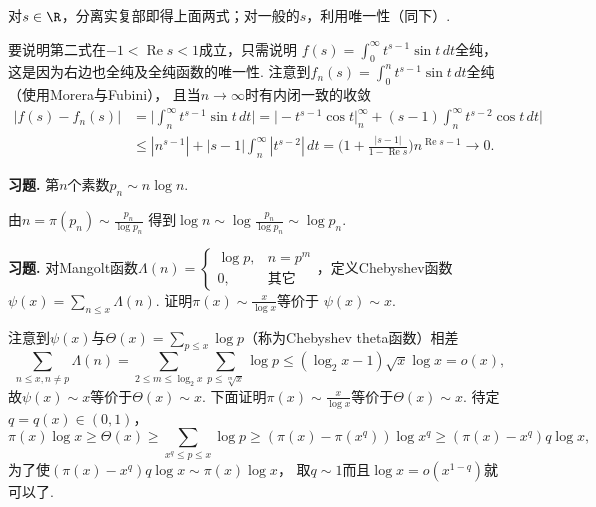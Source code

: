 \begin{proofc}
    对$s\in\R$，分离实复部即得上面两式；对一般的$s$，利用唯一性（同下）.
    要说明第二式在$-1<\operatorname{Re}s<1$成立，只需说明
    $f(s)=\displaystyle{\int_0^\infty t^{s-1}\sin t\,dt}$全纯，
    这是因为右边也全纯及全纯函数的唯一性. 
    注意到$f_n(s)=\displaystyle{\int_0^n t^{s-1}\sin t\,dt}$全纯（使用Morera与Fubini），
    且当$n\rightarrow\infty$时有内闭一致的收敛
    \begin{align*}
        |f(s)-f_n(s)|&=\bigg|\int_n^\infty t^{s-1}\sin t\,dt\bigg|
        =\bigg|-t^{s-1}\cos t\big|_n^\infty
        +(s-1)\int_n^\infty t^{s-2}\cos t\,dt\bigg|\\
        &\leq|n^{s-1}|+|s-1|\int_n^\infty|t^{s-2}|\,dt
        =\Big(1+\frac{|s-1|}{1-\operatorname{Re}s}\Big)
        n^{\operatorname{Re}s-1}\rightarrow0.
    \end{align*}
\end{proofc}

\textbf{习题. } 第$n$个素数$p_n\sim n\log n$.

\begin{proofc}
    由$n=\pi(p_n)\sim\frac{p_n}{\log p_n}$
    得到$\log n\sim \log\frac{p_n}{\log p_n}\sim\log p_n$.
\end{proofc}

\textbf{习题. } 对Mangolt函数$\Lambda(n)
=\begin{cases}\log p,&n=p^m\\0,&\text{其它}\end{cases}$，定义Chebyshev函数
$\psi(x)=\sum\limits_{n\leq x}\Lambda(n)$. 证明$\displaystyle{\pi(x)\sim\frac{x}{\log x}}$等价于
$\psi(x)\sim x$.

\begin{proofc}
    注意到$\psi(x)$与$\varTheta(x)=\sum\limits_{p\leq x}\log p$（称为Chebyshev theta函数）相差
    $$\sum_{n\leq x,n\neq p}\Lambda(n)
    =\sum_{2\leq m\leq\log_2\!x}\sum_{p\leq\!\sqrt[m]{x}}\log p
    \leq(\log_2x-1)\sqrt{x}\log x=o(x),$$
    故$\psi(x)\sim x$等价于$\varTheta(x)\sim x$. 
    下面证明$\pi(x)\sim\frac{x}{\log x}$等价于$\varTheta(x)\sim x$. 
    待定$q=q(x)\in(0,1)$，
    $$\pi(x)\log x\geq\varTheta(x)\geq\sum_{x^q\leq p\leq x}\log p\geq (\pi(x)-\pi(x^q))\log x^q
    \geq(\pi(x)-x^q)q\log x,$$
    为了使$(\pi(x)-x^q)q\log x\sim\pi(x)\log x$，
    取$q\sim 1$而且$\log x=o(x^{1-q})$就可以了.
\end{proofc}

